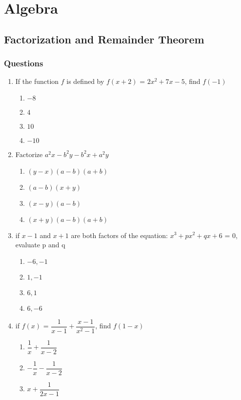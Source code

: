 \chapter{Algebra}
\section{Factorization and Remainder Theorem}
\subsection{Questions}
\begin{multicols}{2}
\begin{enumerate}[label={\arabic*.}]
\item If the function \(f\) is defined by \(f(x+2)\) = \(2x^2 + 7x -5\), find \(f(-1)\)
	\begin{enumerate}[label={\Alph*.}]
	\item \(-8\)
	\item \(4\)
	\item \(10\)
	\item \(-10\)
	\end{enumerate}
\item Factorize \(a^2x - b^2y - b^2x + a^2y\)
	\begin{enumerate}[label={\Alph*.}]
	\item \((y-x)(a-b)(a+b)\)
	\item \((a-b)(x+y)\)
	\item \((x-y)(a-b)\)
	\item \((x+y)(a-b)(a+b)\)
	\end{enumerate}
\item if \(x - 1\) and \(x + 1\) are both factors of the equation: \(x^3 + px^2 + qx + 6 \) = 0, 
evaluate p and q
	\begin{enumerate}[label={\Alph*.}]
	\item \(-6, -1\)
	\item \(1, -1\)
	\item \(6, 1\)
	\item \(6, -6\)
	\end{enumerate}
\item if \(f(x)\) = \(\dfrac{1}{x - 1} + \dfrac{x - 1}{x^2 - 1}\), find \(f(1 - x)\)
	\begin{enumerate}[label={\Alph*.}]
	\item \(\dfrac{1}{x} + \dfrac{1}{x - 2}\)
	\item \( -\dfrac{1}{x} - \dfrac{1}{x - 2}\)
	\item \(x + \dfrac{1}{2x - 1}\)

\end{enumerate}
\end{enumerate}
\end{multicols}
